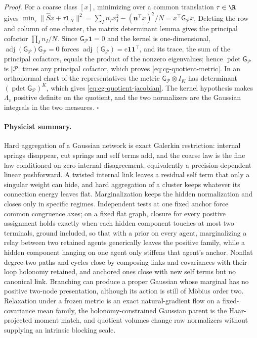 \noindent\emph{Proof.}
For a coarse class \([x]\), minimizing over a common translation \(\tau\in\R\)
gives
\(\min_\tau\|\widehat Sx+\tau\mathbf1_N\|^2
=\sum_In_Ix_I^2-(\mathbf n^\top x)^2/N=x^\top\mathsf G_{\mathcal P}x\).
Deleting the row and column of one cluster, the matrix determinant lemma gives
the principal cofactor \(\prod_In_I/N\). Since
\(\mathsf G_{\mathcal P}\mathbf1=0\) and the kernel is one-dimensional,
\(\operatorname{adj}(\mathsf G_{\mathcal P})\mathsf G_{\mathcal P}=0\) forces
\(\operatorname{adj}(\mathsf G_{\mathcal P})=\mathrm c\mathbf1\mathbf1^\top\), and its
trace, the sum of the principal cofactors, equals the product of the nonzero
eigenvalues; hence \(\operatorname{pdet}\mathsf G_{\mathcal P}\) is
\(|\mathcal P|\) times any principal cofactor, which proves
\eqref{eq:cg-quotient-metric}. In an orthonormal chart of the representatives
the metric \(\mathsf G_{\mathcal P}\otimes I_K\) has determinant
\((\operatorname{pdet}\mathsf G_{\mathcal P})^K\), which gives
\eqref{eq:cg-quotient-jacobian}. The kernel hypothesis makes
\(\Lambda_{\mathrm c}\) positive definite on the quotient, and the two
normalizers are the Gaussian integrals in the two measures. \(\square\)

\paragraph{Physicist summary.}
Hard aggregation of a Gaussian network is exact Galerkin restriction: internal
springs disappear, cut springs and self terms add, and the coarse law is the
fine law conditioned on zero internal disagreement, equivalently a
precision-dependent linear pushforward. A twisted internal link leaves a
residual self term that only a singular weight can hide, and hard aggregation
of a cluster keeps whatever its connection energy leaves flat. Marginalization
keeps the hidden normalization and closes only in specific regimes. Independent
tests at one fixed anchor force common congruence axes; on a fixed flat graph,
closure for every positive assignment holds exactly when each hidden component
touches at most two terminals, ground included, so that with a prior on every
agent, marginalizing a relay between two retained agents generically leaves the
positive family, while a hidden component hanging on one agent only stiffens
that agent's anchor. Nonflat degree-two paths and cycles close by composing
links and covariances with their loop holonomy retained, and anchored ones close
with new self terms but no canonical link. Branching can produce a proper
Gaussian whose marginal has no positive two-node presentation, although its
action is still of M\"obius order two. Relaxation under a frozen metric is an
exact natural-gradient flow on a fixed-covariance mean family, the
holonomy-constrained Gaussian parent is the Haar-projected moment match, and
quotient volumes change raw normalizers without supplying an intrinsic blocking
scale.

